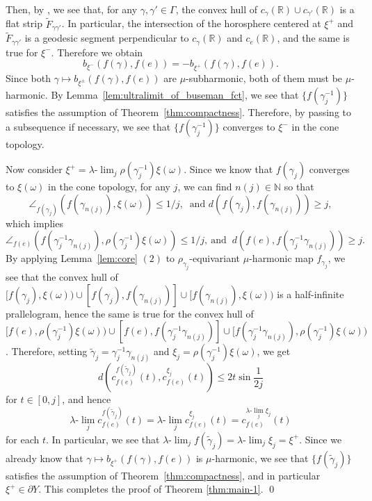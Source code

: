 \documentclass[12pt]{amsart}
\numberwithin{equation}{section}
\theoremstyle{plain}
\theoremstyle{definition}
\theoremstyle{remark}
\newcommand{\R}{{\mathbb R}}
\newcommand{\N}{{\mathbb N}}
\newcommand{\ulim}{\lambda{\text{-}}\!\lim}
\newcommand{\ray}[1]{[#1)}
\newcommand{\cc}[2]{c_{#1}^{#2}}
\begin{document}
 Then, by 
 \cite[p.~182, 2.13 The Flat Strip Theorem]{bridson-haefliger}, 
 we see that, for any $\gamma, \gamma' \in \Gamma$,
 the convex hull of $c_{\gamma}(\R) \cup c_{\gamma'}(\R)$ is a flat strip
 $\tilde F_{\gamma \gamma'}$. 
 In particular, the intersection of the horosphere centered at $\xi^+$
 and $\tilde F_{\gamma \gamma'}$ is a geodesic segment perpendicular to
 $c_{\gamma}(\R)$ and $c_e(\R)$, and the same is true for $\xi^-$. 
 Therefore we obtain
\begin{equation*}
 b_{\xi^-}(f(\gamma),f(e))=-b_{\xi^+}(f(\gamma),f(e)). 
\end{equation*}
 Since both $\gamma \mapsto b_{\xi^{\pm}}(f(\gamma),f(e))$ are 
 $\mu$-subharmonic, both of them must be $\mu$-harmonic. 
 By Lemma~\ref{lem:ultralimit_of_buseman_fct}, we see that
 $\{f(\gamma_j^{-1})\}$ satisfies the assumption of
 Theorem~\ref{thm:compactness}.  
 Therefore, by passing to a subsequence if necessary, we see that 
 $\{f(\gamma_j^{-1})\}$ converges to $\xi^-$ in the cone topology. 
 
 Now consider $\xi^+ =\ulim_j \rho(\gamma_j^{-1})\xi(\omega)$. 
 Since we know that $f(\gamma_j)$ converges to $\xi(\omega)$ in the cone
 topology,  for any $j$, we can find $n(j) \in \N$ so that 
\begin{equation*}
 \angle_{f(\gamma_j)}(f(\gamma_{n(j)}),\xi(\omega))\leq 1/j,\ 
 \text{ and }d(f(\gamma_j),f(\gamma_{n(j)}))\geq j, 
\end{equation*} 
which implies
\begin{equation*}
 \angle_{f(e)}(f(\gamma_j^{-1} \gamma_{n(j)}),
  \rho(\gamma_j^{-1})\xi(\omega)) 
 \leq 1/j, \ \text{and }\ 
 d(f(e),f(\gamma_j^{-1}\gamma_{n(j)})) \geq j. 
\end{equation*}
 By applying Lemma~\ref{lem:core} $(2)$ to
 $\rho_{\gamma_j}$-equivariant $\mu$-harmonic map $f_{\gamma_j}$, we see
 that the convex hull of 
  $\ray{f(\gamma_j),\xi(\omega)}\cup [f(\gamma_j),f(\gamma_{n(j)})] 
 \cup \ray{f(\gamma_{n(j)}),\xi(\omega)}$
 is a half-infinite prallelogram, hence
 the same is true for the convex hull of 
 $\ray{f(e),\rho(\gamma_j^{-1})\xi(\omega)} \cup 
 [f(e),f(\gamma_j^{-1}\gamma_{n(j)})] \cup 
 \ray{f(\gamma_j^{-1}\gamma_{n(j)}),\rho(\gamma_j^{-1})\xi(\omega)}$.
 Therefore, setting 
 $\tilde \gamma_j= \gamma_j^{-1}\gamma_{n(j)}$ and
 $\xi_j=\rho(\gamma_j^{-1})\xi(\omega)$, we get 
\begin{equation*}
 d(\cc{f(e)}{f(\tilde \gamma_j)}(t), 
 \cc{f(e)}{\xi_j}(t)) \leq
 2t \sin \frac{1}{2j}
\end{equation*}
 for $t \in [0,j]$, and hence
\begin{equation*}
 \ulim_j \cc{f(e)}{f(\tilde\gamma_j)}(t) = \ulim_j \cc{f(e)}{\xi_j}(t)
 = \cc{f(e)}{\ulim_j \xi_j}(t)
\end{equation*}
 for each $t$.  In particular, we see that
 $\ulim_j f(\tilde \gamma_j)=\ulim_j \xi_j =\xi^+$. 
 Since we already know that $\gamma \mapsto b_{\xi^+}(f(\gamma),f(e))$
 is $\mu$-harmonic,
 we see that 
 $\{f(\tilde \gamma_j)\}$ satisfies the assumption of
 Theorem~\ref{thm:compactness}, and in particular 
 $\xi^+ \in \partial Y$. 
 This completes the proof of Theorem \ref{thm:main-1}.  \qed
\end{document}

